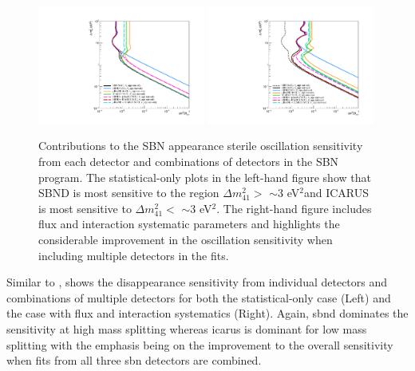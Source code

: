\begin{figure}[h!]
    \centering
    \includegraphics[width = 0.49\textwidth]{figures-chap6/exclusion_contours/nue_app_detector_combinations_stat_only.pdf}
    \includegraphics[width = 0.49\textwidth]{figures-chap6/exclusion_contours/nue_app_detector_combinations_stat+syst.pdf}
    \caption[\nue appearance sensitivities from different detector combinations.]{Contributions to the SBN \nue appearance sterile oscillation sensitivity from each detector and combinations of detectors in the SBN program. The statistical-only plots in the left-hand figure show that SBND is most sensitive to the region $\Delta m_{41}^{2} >$ $\sim$3 eV$^{2}$and ICARUS is most sensitive to $\Delta m_{41}^{2} <$ $\sim$3 eV$^{2}$. The right-hand figure includes flux and interaction systematic parameters and highlights the considerable improvement in the oscillation sensitivity when including multiple detectors in the fits.}
    \label{fig:nue_sensitivity_detector_contribution}
\end{figure}

Similar to ,  shows the \nue disappearance sensitivity from individual detectors and combinations of multiple detectors for both the statistical-only case (Left) and the case with flux and interaction systematics (Right). Again, \gls{sbnd} dominates the sensitivity at high mass splitting whereas \gls{icarus} is dominant for low mass splitting with the emphasis being on the improvement to the overall sensitivity when fits from all three \gls{sbn} detectors are combined.

